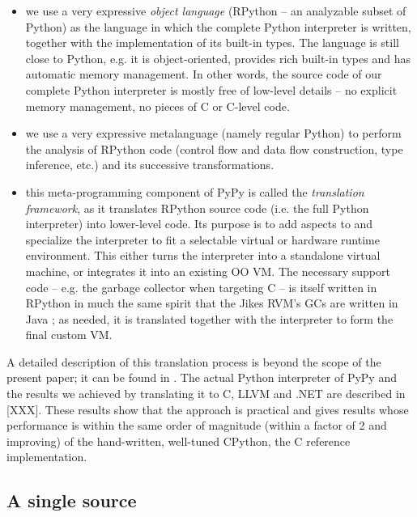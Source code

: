 \documentclass{llncs}
\begin{document}
\begin{itemize}

\item
we use a very expressive \emph{object language} (RPython – an analyzable
subset of Python) as the language in which the complete Python
interpreter is written, together with the implementation of its
built-in types.  The language is still close to Python, e.g.  it is
object-oriented, provides rich built-in types and has automatic memory
management.  In other words, the source code of our complete Python
interpreter is mostly free of low-level details – no explicit memory
management, no pieces of C or C-level code.

\item
we use a very expressive metalanguage (namely regular Python) to
perform the analysis of RPython code (control flow and data flow
construction, type inference, etc.) and its successive
transformations.

\item
this meta-programming component of PyPy is called the \emph{translation
framework}, as it translates RPython source code (i.e. the full Python
interpreter) into lower-level code.  Its purpose is to add aspects to
and specialize the interpreter to fit a selectable virtual or hardware
runtime environment.  This either turns the interpreter into a
standalone virtual machine, or integrates it into an existing OO VM.
The necessary support code – e.g. the garbage collector when
targeting C – is itself written in RPython in much the same spirit
that the Jikes RVM's GCs are written in Java \cite{JikesGC}; as needed, it is
translated together with the interpreter to form the final custom VM.
\end{itemize}

A detailed description of this translation process is beyond the scope of the
present paper; it can be found in \cite{pypyvmconstruction}.  The actual Python
interpreter of PyPy and the results we achieved by translating it to C, LLVM
\cite{LLVM} and .NET are described in [XXX].  These results show that the
approach is practical and gives results whose performance is within the same
order of magnitude (within a factor of 2 and improving) of the hand-written,
well-tuned CPython, the C reference implementation.

\subsection{A single source}
\end{document}

